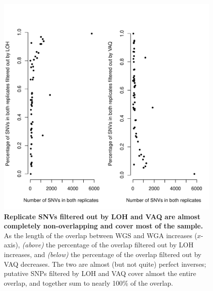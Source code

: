 \documentclass[11 pt]{article} %
\begin{document}
\begin{figure}
\centerline{
\includegraphics[width=5in]{Figure6.pdf} }
\caption{ \textbf{Replicate SNVs filtered out by LOH and VAQ are almost completely non-overlapping and cover most of the sample.} As the length of the overlap between WGS and WGA increases ($x$-axis),  \textit{(above)} the percentage of the overlap filtered out by LOH increases, and \textit{(below)} the percentage of the overlap filtered out by VAQ decreases. The two are almost (but not quite) perfect inverses; putative SNPs filtered by LOH and VAQ cover almost the entire overlap, and together sum to nearly 100\% of the overlap.}
\label{fig:LOH-VAQ_all}
\end{figure}
\end{document}
